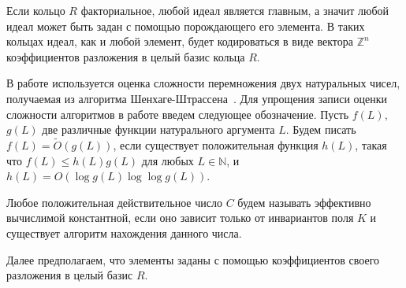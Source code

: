 \documentclass[_00_dissertation.tex]{subfiles}
\begin{document}
\begin{remark}
    Если кольцо $R$ факториальное, любой идеал является главным, а значит любой идеал может быть задан с помощью порождающего его элемента.
    В таких кольцах идеал, как и любой элемент, будет кодироваться в виде вектора $\mathbb{Z}^n$ коэффициентов разложения в целый базис кольца $R$.
\end{remark}

\begin{remark}
    В работе используется оценка сложности перемножения двух натуральных чисел, получаемая из алгоритма Шенхаге-Штрассена~\cite{source:Schonhage}.
    Для упрощения записи оценки сложности алгоритмов в работе введем следующее обозначение.
    Пусть $f(L),$ $g(L)$ две различные функции натурального аргумента $L$.
    Будем писать $f(L) = \tilde O(g(L))$, если существует положительная функция $h(L)$, такая что $f(L) \le h(L)g(L)$ для любых $L \in \mathbb{N}$, и $h(L) = O(\log g(L)\log \log g(L))$.
    
    Любое положительная действительное число $C$ будем называть эффективно вычислимой константной, если оно зависит только от инвариантов поля $K$ и существует алгоритм нахождения данного числа.
\end{remark}

Далее предполагаем, что элементы заданы с помощью коэффициентов своего разложения в целый базис $R$.
\end{document}
